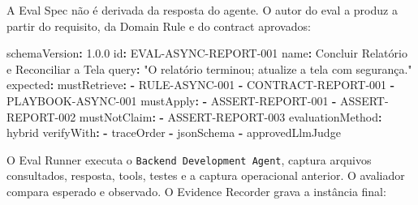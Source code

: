 \documentclass[
  10pt,
  a4paper,
  oneside]{book}
\newenvironment{Shaded}{}{}
\newcommand{\AttributeTok}[1]{\textcolor[rgb]{0.49,0.56,0.16}{#1}}
\newcommand{\FloatTok}[1]{\textcolor[rgb]{0.25,0.63,0.44}{#1}}
\newcommand{\FunctionTok}[1]{\textcolor[rgb]{0.02,0.16,0.49}{#1}}
\newcommand{\KeywordTok}[1]{\textcolor[rgb]{0.00,0.44,0.13}{\textbf{#1}}}
\newcommand{\StringTok}[1]{\textcolor[rgb]{0.25,0.44,0.63}{#1}}
\begin{document}
A Eval Spec não é derivada da resposta do agente. O autor do eval a
produz a partir do requisito, da Domain Rule e do contract aprovados:

\begin{Shaded}
\begin{Highlighting}[]
\FunctionTok{schemaVersion}\KeywordTok{:}\AttributeTok{ }\FloatTok{1.0.0}
\FunctionTok{id}\KeywordTok{:}\AttributeTok{ EVAL{-}ASYNC{-}REPORT{-}001}
\FunctionTok{name}\KeywordTok{:}\AttributeTok{ Concluir Relatório e Reconciliar a Tela}
\FunctionTok{query}\KeywordTok{:}\AttributeTok{ }\StringTok{"O relatório terminou; atualize a tela com segurança."}
\FunctionTok{expected}\KeywordTok{:}
\AttributeTok{  }\FunctionTok{mustRetrieve}\KeywordTok{:}
\AttributeTok{    }\KeywordTok{{-}}\AttributeTok{ RULE{-}ASYNC{-}001}
\AttributeTok{    }\KeywordTok{{-}}\AttributeTok{ CONTRACT{-}REPORT{-}001}
\AttributeTok{    }\KeywordTok{{-}}\AttributeTok{ PLAYBOOK{-}ASYNC{-}001}
\AttributeTok{  }\FunctionTok{mustApply}\KeywordTok{:}
\AttributeTok{    }\KeywordTok{{-}}\AttributeTok{ ASSERT{-}REPORT{-}001}
\AttributeTok{    }\KeywordTok{{-}}\AttributeTok{ ASSERT{-}REPORT{-}002}
\AttributeTok{  }\FunctionTok{mustNotClaim}\KeywordTok{:}
\AttributeTok{    }\KeywordTok{{-}}\AttributeTok{ ASSERT{-}REPORT{-}003}
\FunctionTok{evaluationMethod}\KeywordTok{:}\AttributeTok{ hybrid}
\FunctionTok{verifyWith}\KeywordTok{:}
\AttributeTok{  }\KeywordTok{{-}}\AttributeTok{ traceOrder}
\AttributeTok{  }\KeywordTok{{-}}\AttributeTok{ jsonSchema}
\AttributeTok{  }\KeywordTok{{-}}\AttributeTok{ approvedLlmJudge}
\end{Highlighting}
\end{Shaded}

O Eval Runner executa o \texttt{Backend\ Development\ Agent}, captura
arquivos consultados, resposta, tools, testes e a captura operacional
anterior. O avaliador compara esperado e observado. O Evidence Recorder
grava a instância final:
\end{document}
